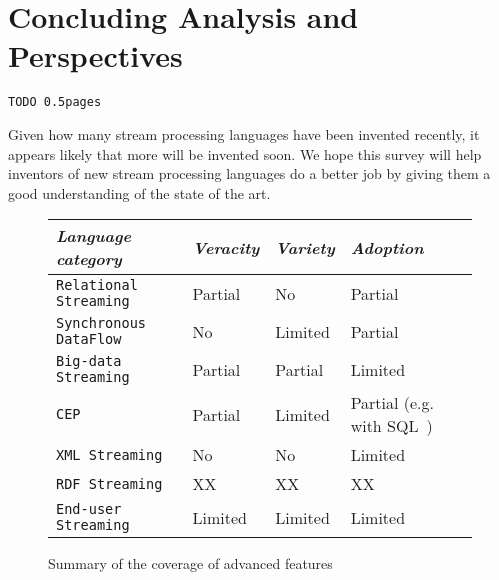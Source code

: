 \section{Concluding Analysis and Perspectives}\label{sec:conclusion}

\begin{alltt}TODO\scriptsize ~0.5 pages
\end{alltt}


Given how many stream processing languages have been invented recently, it appears likely that more will be invented soon. We hope this survey will help inventors of new stream processing languages do a better job by giving them a good understanding of the state of the art.

\begin{figure*}\centering%
  \begin{tabular}{@{}llll@{}}
    \toprule
{\em Language category}
& {\em Veracity} & {\em Variety} & {\em Adoption} \\
\midrule

{\tt Relational Streaming} & Partial \cite{ali_et_al_2009} & No & Partial \cite{jain_et_al_2008} \\
{\tt Synchronous DataFlow}  & No & Limited & Partial \cite{scade_2017} \\
{\tt Big-data Streaming}  & Partial \cite{akidau_et_al_2013} & Partial \cite{hirzel_schneider_gedik_2017} & Limited \\
{\tt CEP} & Partial \cite{chandramouli_goldstein_maier_2010} & Limited & Partial (e.g. with SQL~\cite{zemke_et_al_2007}) \\
{\tt XML Streaming} & No & No & Limited\\
{\tt RDF Streaming} & XX & XX & XX \\
{\tt End-user Streaming} & Limited & Limited & Limited\\
\bottomrule
\end{tabular}
\vspace*{-0.2cm}
\caption{Summary of the coverage of advanced features}
\vspace*{-0.3cm}
\end{figure*}
